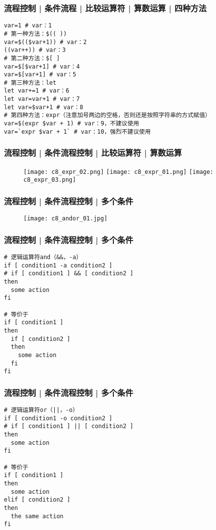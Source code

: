 \begin{frame}[fragile]
  \frametitle{流程控制 | 条件流程 | 比较运算符 | 算数运算 | \alert{四种方法}}
\begin{lstlisting}
var=1 # var：1
# 第一种方法：$(( ))
var=$(($var+1)) # var：2
((var++)) # var：3
# 第二种方法：$[ ]
var=$[$var+1] # var：4
var=$[var+1] # var：5
# 第三种方法：let
let var+=1 # var：6
let var=var+1 # var：7
let var=$var+1 # var：8
# 第四种方法：expr（注意加号两边的空格，否则还是按照字符串的方式赋值）
var=$(expr $var + 1) # var：9，不建议使用
var=`expr $var + 1` # var：10，强烈不建议使用
\end{lstlisting}
\end{frame}

\begin{frame}[fragile]
  \frametitle{流程控制 | 条件流程控制 | 比较运算符 | 算数运算}
  \begin{figure}
    \centering
    \texttt{[image: c8\_expr\_02.png]}
    \texttt{[image: c8\_expr\_01.png]}
    \vspace{0.3cm}
    \texttt{[image: c8\_expr\_03.png]}
  \end{figure}
\end{frame}

\begin{frame}
  \frametitle{流程控制 | 条件流程控制 | \alert{多个条件}}
  \begin{figure}
    \centering
    \texttt{[image: c8\_andor\_01.jpg]}
  \end{figure}
\end{frame}

\begin{frame}[fragile]
  \frametitle{流程控制 | 条件流程控制 | 多个条件}
\begin{lstlisting}
# 逻辑运算符and（&&，-a）
if [ condition1 -a condition2 ]
# if [ condition1 ] && [ condition2 ]
then
  some action
fi

# 等价于
if [ condition1 ]
then
  if [ condition2 ]
  then
    some action
  fi
fi
\end{lstlisting}
\end{frame}

\begin{frame}[fragile]
  \frametitle{流程控制 | 条件流程控制 | 多个条件}
\begin{lstlisting}
# 逻辑运算符or（||，-o）
if [ condition1 -o condition2 ]
# if [ condition1 ] || [ condition2 ]
then
  some action
fi

# 等价于
if [ condition1 ]
then
  some action
elif [ condition2 ]
then
  the same action
fi
\end{lstlisting}
\end{frame}


